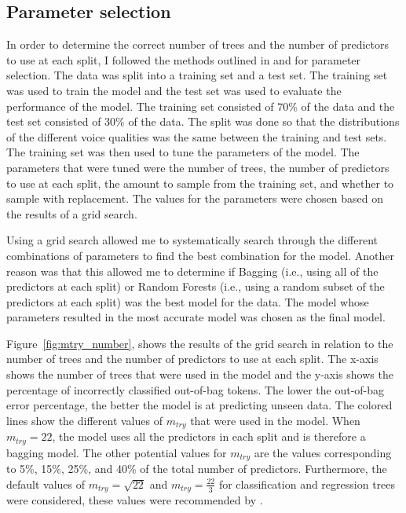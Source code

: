 \subsection{Parameter selection} \label{sec:bagging_model}

In order to determine the correct number of trees and the number of predictors to use at each split, I followed the methods outlined in \citet{boehmkeHandsOnMachineLearning2019} and \citet{jamesIntroductionStatisticalLearning2021} for parameter selection. The data was split into a training set and a test set. The training set was used to train the model and the test set was used to evaluate the performance of the model. The training set consisted of 70\% of the data and the test set consisted of 30\% of the data. The split was done so that the distributions of the different voice qualities was the same between the training and test sets. The training set was then used to tune the parameters of the model. The parameters that were tuned were the number of trees, the number of predictors to use at each split, the amount to sample from the training set, and whether to sample with replacement. The values for the parameters were chosen based on the results of a grid search.

Using a grid search allowed me to systematically search through the different combinations of parameters to find the best combination for the model. Another reason was that this allowed me to determine if Bagging (i.e., using all of the predictors at each split) or Random Forests (i.e., using a random subset of the predictors at each split) was the best model for the data. The model whose parameters resulted in the most accurate model was chosen as the final model. 

Figure~\ref{fig:mtry_number}, shows the results of the grid search in relation to the number of trees and the number of predictors to use at each split. The x-axis shows the number of trees that were used in the model and the y-axis shows the percentage of incorrectly classified out-of-bag tokens. The lower the out-of-bag error percentage, the better the model is at predicting unseen data. The colored lines show the different values of $m_{try}$ that were used in the model. When $m_{try} = 22$, the model uses all the predictors in each split and is therefore a bagging model. The other potential values for $m_{try}$ are the values corresponding to 5\%, 15\%, 25\%, and 40\% of the total number of predictors. Furthermore, the default values of $m_{try} = \sqrt{22}$ and $m_{try} = \frac{22}{3}$ for classification and regression trees were considered, these values were recommended by \citet{boehmkeHandsOnMachineLearning2019}. 

